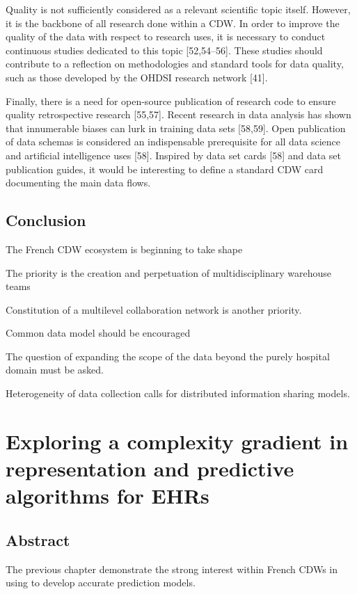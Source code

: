 \documentclass[french,12pt,twoside,a4paper]{book}
\begin{document}
Quality is not sufficiently considered as a relevant scientific topic itself.
However, it is the backbone of all research done within a CDW. In order to
improve the quality of the data with respect to research uses, it is necessary
to conduct continuous studies dedicated to this topic [52,54–56]. These studies
should contribute to a reflection on methodologies and standard tools for data
quality, such as those developed by the OHDSI research network [41].

Finally, there is a need for open-source publication of research code to ensure
quality retrospective research [55,57]. Recent research in data analysis has
shown that innumerable biases can lurk in training data sets [58,59]. Open
publication of data schemas is considered an indispensable prerequisite for all
data science and artificial intelligence uses [58]. Inspired by data set cards
  [58] and data set publication guides, it would be interesting to define a
standard CDW card documenting the main data flows.

\section{Conclusion}\label{sec:cdw:conclusion}

The French CDW ecosystem is beginning to take shape

The priority is the creation and perpetuation of multidisciplinary warehouse teams

Constitution of a multilevel collaboration network is another priority.

Common data model should be encouraged

The question of expanding the scope of the data beyond the purely hospital domain must be asked.

Heterogeneity of data collection calls for distributed information sharing models.

\chapter{Exploring a complexity gradient in representation and predictive algorithms for EHRs}\label{chapter:predictive_models}
\section{Abstract}\label{sec:predictive_models:abstract}

The previous chapter demonstrate the strong interest within French CDWs in using to develop
accurate prediction models.
\end{document}

